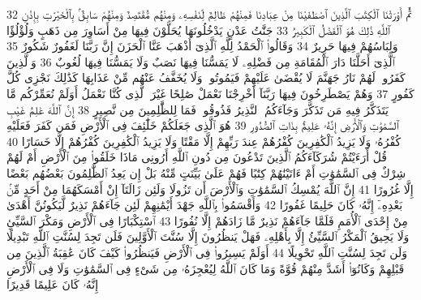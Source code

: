 {\tiny\colorbox{cl_aya}{32}} ثُمَّ أَوْرَثْنَا ٱلْكِتَٰبَ ٱلَّذِينَ ٱصْطَفَيْنَا مِنْ عِبَادِنَا فَمِنْهُمْ ظَالِمٌ لِّنَفْسِهِۦ وَمِنْهُم مُّقْتَصِدٌ وَمِنْهُمْ سَابِقٌۢ بِٱلْخَيْرَٰتِ بِإِذْنِ ٱللَّهِ ذَٰلِكَ هُوَ ٱلْفَضْلُ ٱلْكَبِيرُ
{\tiny\colorbox{cl_aya}{33}} جَنَّٰتُ عَدْنٍ يَدْخُلُونَهَا يُحَلَّوْنَ فِيهَا مِنْ أَسَاوِرَ مِن ذَهَبٍ وَلُؤْلُؤًا وَلِبَاسُهُمْ فِيهَا حَرِيرٌ
{\tiny\colorbox{cl_aya}{34}} وَقَالُوا۟ ٱلْحَمْدُ لِلَّهِ ٱلَّذِىٓ أَذْهَبَ عَنَّا ٱلْحَزَنَ إِنَّ رَبَّنَا لَغَفُورٌ شَكُورٌ
{\tiny\colorbox{cl_aya}{35}} ٱلَّذِىٓ أَحَلَّنَا دَارَ ٱلْمُقَامَةِ مِن فَضْلِهِۦ لَا يَمَسُّنَا فِيهَا نَصَبٌ وَلَا يَمَسُّنَا فِيهَا لُغُوبٌ
{\tiny\colorbox{cl_aya}{36}} وَٱلَّذِينَ كَفَرُوا۟ لَهُمْ نَارُ جَهَنَّمَ لَا يُقْضَىٰ عَلَيْهِمْ فَيَمُوتُوا۟ وَلَا يُخَفَّفُ عَنْهُم مِّنْ عَذَابِهَا كَذَٰلِكَ نَجْزِى كُلَّ كَفُورٍ
{\tiny\colorbox{cl_aya}{37}} وَهُمْ يَصْطَرِخُونَ فِيهَا رَبَّنَآ أَخْرِجْنَا نَعْمَلْ صَٰلِحًا غَيْرَ ٱلَّذِى كُنَّا نَعْمَلُ أَوَلَمْ نُعَمِّرْكُم مَّا يَتَذَكَّرُ فِيهِ مَن تَذَكَّرَ وَجَآءَكُمُ ٱلنَّذِيرُ فَذُوقُوا۟ فَمَا لِلظَّٰلِمِينَ مِن نَّصِيرٍ
{\tiny\colorbox{cl_aya}{38}} إِنَّ ٱللَّهَ عَٰلِمُ غَيْبِ ٱلسَّمَٰوَٰتِ وَٱلْأَرْضِ إِنَّهُۥ عَلِيمٌۢ بِذَاتِ ٱلصُّدُورِ
{\tiny\colorbox{cl_aya}{39}} هُوَ ٱلَّذِى جَعَلَكُمْ خَلَٰٓئِفَ فِى ٱلْأَرْضِ فَمَن كَفَرَ فَعَلَيْهِ كُفْرُهُۥ وَلَا يَزِيدُ ٱلْكَٰفِرِينَ كُفْرُهُمْ عِندَ رَبِّهِمْ إِلَّا مَقْتًا وَلَا يَزِيدُ ٱلْكَٰفِرِينَ كُفْرُهُمْ إِلَّا خَسَارًا
{\tiny\colorbox{cl_aya}{40}} قُلْ أَرَءَيْتُمْ شُرَكَآءَكُمُ ٱلَّذِينَ تَدْعُونَ مِن دُونِ ٱللَّهِ أَرُونِى مَاذَا خَلَقُوا۟ مِنَ ٱلْأَرْضِ أَمْ لَهُمْ شِرْكٌ فِى ٱلسَّمَٰوَٰتِ أَمْ ءَاتَيْنَٰهُمْ كِتَٰبًا فَهُمْ عَلَىٰ بَيِّنَتٍ مِّنْهُ بَلْ إِن يَعِدُ ٱلظَّٰلِمُونَ بَعْضُهُم بَعْضًا إِلَّا غُرُورًا
{\tiny\colorbox{cl_aya}{41}} إِنَّ ٱللَّهَ يُمْسِكُ ٱلسَّمَٰوَٰتِ وَٱلْأَرْضَ أَن تَزُولَا وَلَئِن زَالَتَآ إِنْ أَمْسَكَهُمَا مِنْ أَحَدٍ مِّنۢ بَعْدِهِۦٓ إِنَّهُۥ كَانَ حَلِيمًا غَفُورًا
{\tiny\colorbox{cl_aya}{42}} وَأَقْسَمُوا۟ بِٱللَّهِ جَهْدَ أَيْمَٰنِهِمْ لَئِن جَآءَهُمْ نَذِيرٌ لَّيَكُونُنَّ أَهْدَىٰ مِنْ إِحْدَى ٱلْأُمَمِ فَلَمَّا جَآءَهُمْ نَذِيرٌ مَّا زَادَهُمْ إِلَّا نُفُورًا
{\tiny\colorbox{cl_aya}{43}} ٱسْتِكْبَارًا فِى ٱلْأَرْضِ وَمَكْرَ ٱلسَّيِّئِ وَلَا يَحِيقُ ٱلْمَكْرُ ٱلسَّيِّئُ إِلَّا بِأَهْلِهِۦ فَهَلْ يَنظُرُونَ إِلَّا سُنَّتَ ٱلْأَوَّلِينَ فَلَن تَجِدَ لِسُنَّتِ ٱللَّهِ تَبْدِيلًا وَلَن تَجِدَ لِسُنَّتِ ٱللَّهِ تَحْوِيلًا
{\tiny\colorbox{cl_aya}{44}} أَوَلَمْ يَسِيرُوا۟ فِى ٱلْأَرْضِ فَيَنظُرُوا۟ كَيْفَ كَانَ عَٰقِبَةُ ٱلَّذِينَ مِن قَبْلِهِمْ وَكَانُوٓا۟ أَشَدَّ مِنْهُمْ قُوَّةً وَمَا كَانَ ٱللَّهُ لِيُعْجِزَهُۥ مِن شَىْءٍ فِى ٱلسَّمَٰوَٰتِ وَلَا فِى ٱلْأَرْضِ إِنَّهُۥ كَانَ عَلِيمًا قَدِيرًا
